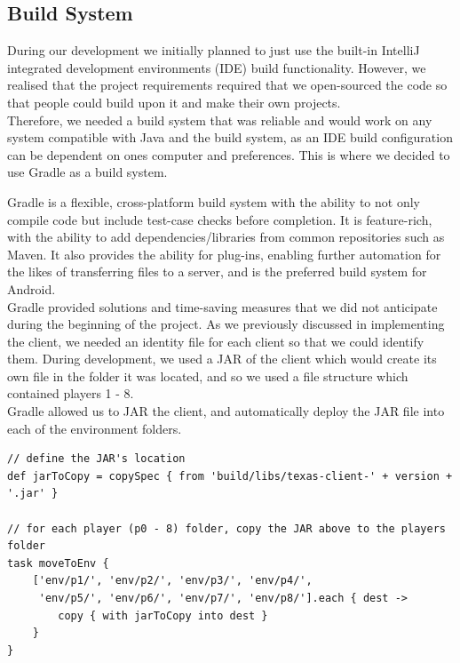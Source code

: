 \documentclass[11pt]{article}
\begin{document}
\newpage

\subsection{Build System}
During our development we initially planned to just use the built-in IntelliJ integrated development environments (IDE) build functionality. However, we realised that the project requirements required that we open-sourced the code so that people could build upon it and make their own projects. \\

Therefore, we needed a build system that was reliable and would work on any system compatible with Java and the build system, as an IDE build configuration can be dependent on ones computer and preferences. This is where we decided to use Gradle as a build system.

Gradle \citep{gradle} is a flexible, cross-platform build system with the ability to not only compile code but include test-case checks before completion. It is feature-rich, with the ability to add dependencies/libraries from common repositories such as Maven\citep{maven}. It also provides the ability for plug-ins, enabling further automation for the likes of transferring files to a server, and is the preferred build system for Android. \cite{android_gradle} \\

Gradle provided solutions and time-saving measures that we did not anticipate during the beginning of the project. As we previously discussed in implementing the client, we needed an identity file for each client so that we could identify them. During development, we used a JAR of the client which would create its own file in the folder it was located, and so we used a file structure which contained players 1 - 8. \\


Gradle allowed us to JAR the client, and automatically deploy the JAR file into each of the environment folders. 

\begin{lstlisting}
// define the JAR's location 
def jarToCopy = copySpec { from 'build/libs/texas-client-' + version + '.jar' }

// for each player (p0 - 8) folder, copy the JAR above to the players folder
task moveToEnv {
    ['env/p1/', 'env/p2/', 'env/p3/', 'env/p4/', 
     'env/p5/', 'env/p6/', 'env/p7/', 'env/p8/'].each { dest ->
        copy { with jarToCopy into dest }
    }
}
\end{lstlisting}
\end{document}

